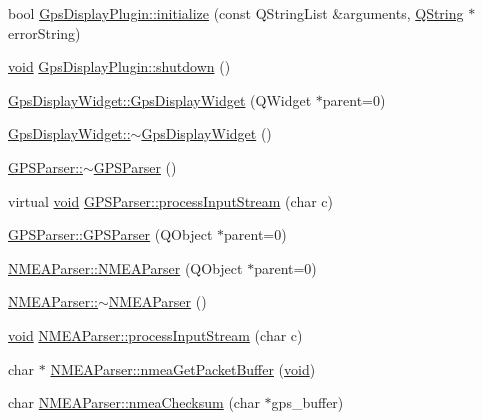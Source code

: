 \begin{DoxyCompactItemize}
\item 
bool \hyperlink{group___g_p_s_gadget_plugin_ga481b9c74a2e46d2e461d472ac2e10c8f}{\-Gps\-Display\-Plugin\-::initialize} (const \-Q\-String\-List \&arguments, \hyperlink{group___u_a_v_objects_plugin_gab9d252f49c333c94a72f97ce3105a32d}{\-Q\-String} $\ast$error\-String)
\item 
\hyperlink{group___u_a_v_objects_plugin_ga444cf2ff3f0ecbe028adce838d373f5c}{void} \hyperlink{group___g_p_s_gadget_plugin_ga239f5aa443093c518b27a04e23d20b2e}{\-Gps\-Display\-Plugin\-::shutdown} ()
\item 
\hyperlink{group___g_p_s_gadget_plugin_gab1f79fecf5da3b9fde3b8c100406dfd8}{\-Gps\-Display\-Widget\-::\-Gps\-Display\-Widget} (\-Q\-Widget $\ast$parent=0)
\item 
\hyperlink{group___g_p_s_gadget_plugin_gaf71af26494c1e959b1b6b3eabd861e53}{\-Gps\-Display\-Widget\-::$\sim$\-Gps\-Display\-Widget} ()
\item 
\hyperlink{group___g_p_s_gadget_plugin_ga6773ae49e6fecc274191f0d0e29294d8}{\-G\-P\-S\-Parser\-::$\sim$\-G\-P\-S\-Parser} ()
\item 
virtual \hyperlink{group___u_a_v_objects_plugin_ga444cf2ff3f0ecbe028adce838d373f5c}{void} \hyperlink{group___g_p_s_gadget_plugin_gaeffbbe785fb02705aba8d3e2b0aee5e5}{\-G\-P\-S\-Parser\-::process\-Input\-Stream} (char c)
\item 
\hyperlink{group___g_p_s_gadget_plugin_ga15bb435154bfad7f732bc090c496915e}{\-G\-P\-S\-Parser\-::\-G\-P\-S\-Parser} (\-Q\-Object $\ast$parent=0)
\item 
\hyperlink{group___g_p_s_gadget_plugin_gababc72322cf2d939a88939cc9036d884}{\-N\-M\-E\-A\-Parser\-::\-N\-M\-E\-A\-Parser} (\-Q\-Object $\ast$parent=0)
\item 
\hyperlink{group___g_p_s_gadget_plugin_gaedf659d241eff03757c31f3b80697f89}{\-N\-M\-E\-A\-Parser\-::$\sim$\-N\-M\-E\-A\-Parser} ()
\item 
\hyperlink{group___u_a_v_objects_plugin_ga444cf2ff3f0ecbe028adce838d373f5c}{void} \hyperlink{group___g_p_s_gadget_plugin_gaf4983b5649be1ec2deb7dafcd4a3573c}{\-N\-M\-E\-A\-Parser\-::process\-Input\-Stream} (char c)
\item 
char $\ast$ \hyperlink{group___g_p_s_gadget_plugin_ga5c79371e20badd15d23705c63eaacfe1}{\-N\-M\-E\-A\-Parser\-::nmea\-Get\-Packet\-Buffer} (\hyperlink{group___u_a_v_objects_plugin_ga444cf2ff3f0ecbe028adce838d373f5c}{void})
\item 
char \hyperlink{group___g_p_s_gadget_plugin_gaba9a601d8ec049e7f398b5d42cd974a1}{\-N\-M\-E\-A\-Parser\-::nmea\-Checksum} (char $\ast$gps\-\_\-buffer)

\end{DoxyCompactItemize}
